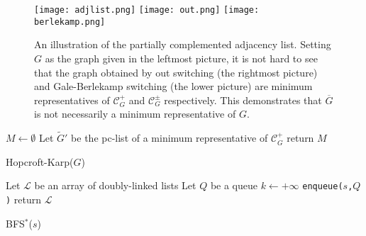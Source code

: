 \documentclass{llncs}
\begin{document}
\begin{figure}[htp]\label{fig:pclist}

\texttt{[image: adjlist.png]} \texttt{[image: out.png]}
\centering
\texttt{[image: berlekamp.png]}
\caption{An illustration of the partially complemented adjacency list.  Setting $G$ as the graph given in the leftmost picture, it is not hard to see that the graph obtained by out switching (the rightmost picture) and Gale-Berlekamp switching (the lower picture) are minimum representatives of $\mathcal{C}_G^+$ and $\mathcal{C}_G^{\pm}$ respectively.  This demonstrates that $\overline{G}$ is not necessarily a minimum representative of $G$.}
\end{figure}

\begin{algorithm}
$M \longleftarrow \emptyset$\;
Let $\widetilde{G}'$ be the pc-list of a minimum representative of $\mathcal{C}^+_G$\;
return $M$\;
\caption{Hopcroft-Karp($G$)}  \label{HK}
\end{algorithm}


\begin{algorithm} \label{alg:BFS}
Let $\mathcal{L}$ be an array of doubly-linked lists\;
Let $Q$ be a queue\;
$k \longleftarrow +\infty$\;
\texttt{enqueue($s$,$Q$)}\;
return $\mathcal{L}$
\caption{BFS$^*$($s$)} 
\end{algorithm}
\end{document}
